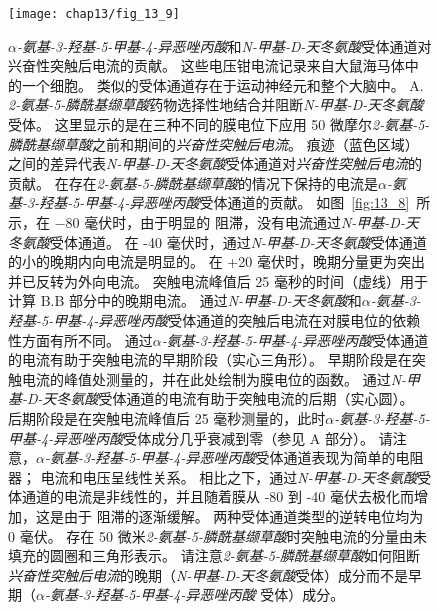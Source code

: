 \begin{figure}[htbp]
	\centering
	\texttt{[image: chap13/fig\_13\_9]}
	\caption{\textit{$\alpha$-氨基-3-羟基-5-甲基-4-异恶唑丙酸}和\textit{N-甲基-D-天冬氨酸}受体通道对兴奋性突触后电流的贡献。
		这些电压钳电流记录来自大鼠海马体中的一个细胞。
		类似的受体通道存在于运动神经元和整个大脑中\cite{hestrin1990analysis}。
	A. \textit{2-氨基-5-膦酰基缬草酸}药物选择性地结合并阻断\textit{N-甲基-D-天冬氨酸}受体。
	这里显示的是在三种不同的膜电位下应用 50 微摩尔\textit{2-氨基-5-膦酰基缬草酸}之前和期间的\textit{兴奋性突触后电流}。
	痕迹（蓝色区域）之间的差异代表\textit{N-甲基-D-天冬氨酸}受体通道对\textit{兴奋性突触后电流}的贡献。
	在存在\textit{2-氨基-5-膦酰基缬草酸}的情况下保持的电流是\textit{$\alpha$-氨基-3-羟基-5-甲基-4-异恶唑丙酸}受体通道的贡献。
	如图~\ref{fig:13_8}~所示，在 −80 毫伏时，由于明显的  阻滞，没有电流通过\textit{N-甲基-D-天冬氨酸}受体通道。
	在 -40 毫伏时，通过\textit{N-甲基-D-天冬氨酸}受体通道的小的晚期内向电流是明显的。 
	在 +20 毫伏时，晚期分量更为突出并已反转为外向电流。
	突触电流峰值后 25 毫秒的时间（虚线）用于计算 B.B 部分中的晚期电流。
	通过\textit{N-甲基-D-天冬氨酸}和\textit{$\alpha$-氨基-3-羟基-5-甲基-4-异恶唑丙酸}受体通道的突触后电流在对膜电位的依赖性方面有所不同。
	通过\textit{$\alpha$-氨基-3-羟基-5-甲基-4-异恶唑丙酸}受体通道的电流有助于突触电流的早期阶段（实心三角形）。
	早期阶段是在突触电流的峰值处测量的，并在此处绘制为膜电位的函数。
	通过\textit{N-甲基-D-天冬氨酸}受体通道的电流有助于突触电流的后期（实心圆）。
	后期阶段是在突触电流峰值后 25 毫秒测量的，此时\textit{$\alpha$-氨基-3-羟基-5-甲基-4-异恶唑丙酸}受体成分几乎衰减到零（参见 A 部分）。
	请注意，\textit{$\alpha$-氨基-3-羟基-5-甲基-4-异恶唑丙酸}受体通道表现为简单的电阻器；
	电流和电压呈线性关系。
	相比之下，通过\textit{N-甲基-D-天冬氨酸}受体通道的电流是非线性的，并且随着膜从 -80 到 -40 毫伏去极化而增加，这是由于  阻滞的逐渐缓解。
	两种受体通道类型的逆转电位均为 0 毫伏。
	存在 50 微米\textit{2-氨基-5-膦酰基缬草酸}时突触电流的分量由未填充的圆圈和三角形表示。
	请注意\textit{2-氨基-5-膦酰基缬草酸}如何阻断\textit{兴奋性突触后电流}的晚期（\textit{N-甲基-D-天冬氨酸}受体）成分而不是早期（\textit{$\alpha$-氨基-3-羟基-5-甲基-4-异恶唑丙酸} 受体）成分。}
	\label{fig:13_9}
\end{figure}


